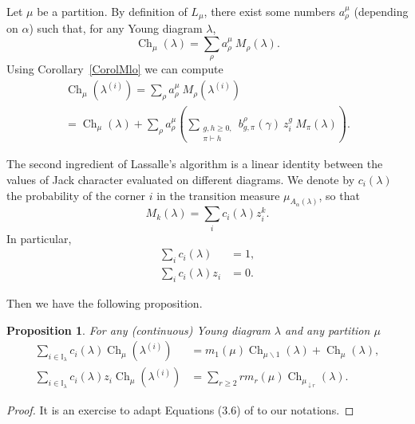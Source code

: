 \documentclass[11pt]{amsart}
\theoremstyle{plain}
\newtheorem{proposition}[lemma]{Proposition}
\theoremstyle{remark}
\newcommand{\II}{\mathbb{I}}
\DeclareMathOperator{\Ch}{Ch}
\begin{document}
Let $\mu$ be a partition. 
By definition of $L_\mu$, there exist some numbers $a^\mu_\rho$ (depending on $\alpha$)
such that, for any Young diagram $\lambda$,
\[ \Ch_\mu(\lambda) = \sum_\rho a^\mu_\rho\ M_\rho(\lambda). \]
Using Corollary~\ref{CorolMlo} we can compute
\begin{multline}\label{EqIng1Lassalle}
    \Ch_\mu(\lambda^{(i)}) = \sum_\rho a^\mu_\rho\ M_\rho(\lambda^{(i)}) \\
    = \Ch_\mu(\lambda) + \sum_\rho a^\mu_\rho \left( \sum_{\substack{g,h \geq 0, \\ \pi \vdash h}}
    b_{g,\pi}^\rho(\gamma)\ z_i^g\ M_\pi(\lambda) \right).
    \end{multline}

The second ingredient of Lassalle's algorithm is a linear identity between the values of
Jack character evaluated on different diagrams.
We denote by $c_i(\lambda)$ the probability of the corner $i$ in the transition measure 
$\mu_{A_\alpha(\lambda)}$,
so that
\begin{equation}\label{eq:Mk_co}
    M_k(\lambda) = \sum_i c_i(\lambda) z_i^k.
\end{equation}
In particular,
\begin{align}
    \sum_i c_i(\lambda)&=1, \label{eq:Sum_co}\\
    \sum_i c_i(\lambda) z_i&=0.\label{Sum_cozo}
\end{align}

Then we have \cite[Equation (3.6)]{Lassalle2009} the following proposition.
\begin{proposition}\label{PropLinearRelation}
    For any (continuous) Young diagram $\lambda$ and any partition $\mu$
    \begin{align*}
        \sum_{i \in \II_\lambda} c_i(\lambda) \Ch_\mu(\lambda^{(i)})
        &= m_1(\mu) \Ch_{\mu \backslash 1}(\lambda) + \Ch_\mu(\lambda), \\
        \sum_{i \in \II_\lambda} c_i(\lambda) z_i \Ch_\mu(\lambda^{(i)})
        &= \sum_{r \geq 2} r m_r(\mu) \Ch_{\mu_{\downarrow r}} (\lambda).
    \end{align*}
\end{proposition}
\begin{proof}
    It is an exercise to adapt Equations (3.6) of \cite{Lassalle2009} to our notations.
\end{proof}
\end{document}
